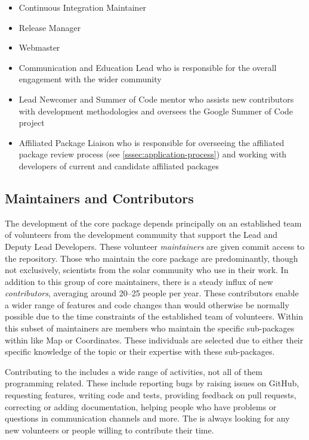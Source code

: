 \begin{itemize}
    \item Continuous Integration Maintainer
    \item Release Manager
    \item Webmaster
    \item Communication and Education Lead who is responsible for the overall engagement with the wider community
    \item Lead Newcomer and Summer of Code mentor who assists new contributors with \sunpyproj development methodologies and oversees the Google Summer of Code project
    \item Affiliated Package Liaison who is responsible for overseeing the affiliated package review process (see \autoref{sssec:application-process}) and working with developers of current and candidate affiliated packages
\end{itemize}

\subsection{Maintainers and Contributors}
\label{ssec:maintainers-and-contributors}

The development of the \sunpypkg core package depends principally on an established team of volunteers from the development community that support the Lead and Deputy Lead Developers.
These volunteer \textit{maintainers} are given commit access to the \sunpypkg repository.
Those who maintain the \sunpypkg core package are predominantly, though not exclusively, scientists from the solar community who use \sunpypkg in their work.
In addition to this group of core maintainers, there is a steady influx of new \textit{contributors}, averaging around 20--25 people per year.
These contributors enable a wider range of features and code changes than would otherwise be normally possible due to the time constraints of the established team of volunteers.
Within this subset of maintainers are members who maintain the specific sub-packages within \sunpypkg like Map or Coordinates.
These individuals are selected due to either their specific knowledge of the topic or their expertise with these sub-packages.

Contributing to the \sunpyproj includes a wide range of activities, not all of them programming related.
These include reporting bugs by raising issues on GitHub, requesting features, writing code and tests, providing feedback on pull requests, correcting or adding documentation, helping people who have problems or questions in communication channels and more.
The \sunpyproj is always looking for any new volunteers or people willing to contribute their time.
